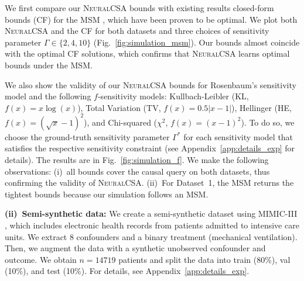 \documentclass{article} %
\newcommand{\frameworkname}{\textsc{NeuralCSA}\xspace}
\theoremstyle{definition}
\theoremstyle{plain}
\begin{document}
We first compare our \frameworkname bounds with existing results closed-form bounds (CF) for the MSM \citep{Dorn.2022, Frauen.2023c}, which have been proven to be optimal. We plot both \frameworkname and the CF for both datasets and three choices of sensitivity parameter $\Gamma \in \{2, 4, 10\}$ (Fig.~\ref{fig:simulation_msm}). Our bounds almost coincide with the optimal CF solutions, which confirms that \frameworkname learns optimal bounds under the MSM.

We also show the validity of our \frameworkname bounds for Rosenbaum's sensitivity model and the following $f$-sensitivity models: Kullbach-Leibler (KL, $f(x) = x \log(x)$), Total Variation (TV, $f(x) = 0.5 |x-1|$), Hellinger (HE, $f(x) = (\sqrt{x} - 1)^2$), and Chi-squared ($\chi^2$, $f(x) = (x-1)^2$). To do so, we choose the ground-truth sensitivity parameter $\Gamma^\ast$ for each sensitivity model that satisfies the respective sensitivity constraint (see Appendix~\ref{app:details_exp} for details). The results are in Fig.~\ref{fig:simulation_f}. We make the following observations: (i)~all bounds cover the causal query on both datasets, thus confirming the validity of \frameworkname. (ii)~For Dataset~1, the MSM returns the tightest bounds because our simulation follows an MSM.

\textbf{(ii)~Semi-synthetic data:}
We create a semi-synthetic dataset using MIMIC-III \citep{Johnson.2016}, which includes electronic health records from patients admitted to intensive care units. We extract $8$ confounders and a binary treatment (mechanical ventilation). Then, we augment the data with a synthetic unobserved confounder and outcome. We obtain $n=14719$ patients and split the data into train (80\%), val (10\%), and test (10\%). For details, see Appendix~\ref{app:details_exp}.
\end{document}
